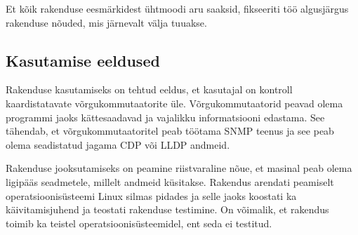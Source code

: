 \documentclass[12pt]{article}
\begin{document}
Et kõik rakenduse eesmärkidest ühtmoodi aru saaksid, fikseeriti töö algusjärgus rakenduse nõuded,
mis järnevalt välja tuuakse.

\subsection{Kasutamise eeldused}
Rakenduse kasutamiseks on tehtud eeldus, et kasutajal on kontroll kaardistatavate võrgukommutaatorite üle.
Võrgukommutaatorid peavad olema programmi jaoks kättesaadavad ja vajalikku informatsiooni edastama.
See tähendab, et võrgukommutaatoritel peab töötama SNMP teenus ja see peab olema seadistatud jagama
CDP või LLDP andmeid.

Rakenduse jooksutamiseks on peamine riistvaraline nõue, et masinal peab olema ligipääs seadmetele,
millelt andmeid küsitakse.
Rakendus arendati peamiselt operatsioonisüsteemi Linux silmas pidades ja selle jaoks koostati ka
käivitamisjuhend ja teostati rakenduse testimine.
On võimalik, et rakendus toimib ka teistel operatsioonisüsteemidel, ent seda ei testitud.
\end{document}
